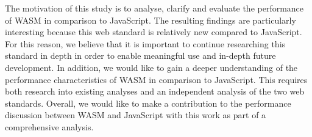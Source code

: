 The motivation of this study is to analyse, clarify and evaluate the performance of WASM in comparison to JavaScript. The resulting findings are particularly interesting because this web standard is relatively new compared to JavaScript.
For this reason, we believe that it is important to continue researching this standard in depth in order to enable meaningful use and in-depth future development. In addition, we would like to gain a deeper understanding of the performance characteristics of WASM in comparison to JavaScript. This requires both research into existing analyses and an independent analysis of the two web standards.
Overall, we would like to make a contribution to the performance discussion between WASM and JavaScript with this work as part of a comprehensive analysis.